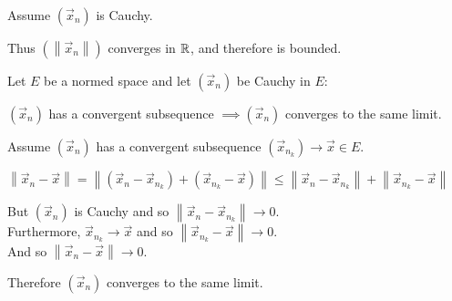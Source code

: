 \documentclass[letterpaper,12pt,fleqn]{article}
\newcommand{\vx}{\vec{x}}
\newcommand{\norm}[1]{\left\|#1\right\|}
\begin{document}
\newpage

\begin{theproof}
  Assume $(\vx_n)$ is Cauchy.

  Thus $(\norm{\vx_n})$ converges in $\mathbb{R}$, and therefore is bounded.
\end{theproof}

\begin{theorem}
  Let $E$ be a normed space and let $(\vx_n)$ be Cauchy in $E$:

  \qquad $(\vx_n)$ has a convergent subsequence $\implies(\vx_n)$ converges to
  the same limit.
\end{theorem}

\begin{theproof}
  Assume $(\vx_n)$ has a convergent subsequence $(\vx_{n_k})\to\vx\in E$.

  $\norm{\vx_n-\vx}=\norm{(\vx_n-\vx_{n_k})+(\vx_{n_k}-\vx)}\le
  \norm{\vx_n-\vx_{n_k}}+\norm{\vx_{n_k}-\vx}$

  But $(\vx_n)$ is Cauchy and so $\norm{\vx_n-\vx_{n_k}}\to0$. \\
  Furthermore, $\vx_{n_k}\to\vx$ and so $\norm{\vx_{n_k}-\vx}\to0$. \\
  And so $\norm{\vx_n-\vx}\to0$.

  Therefore $(\vx_n)$ converges to the same limit.
\end{theproof}
\end{document}
